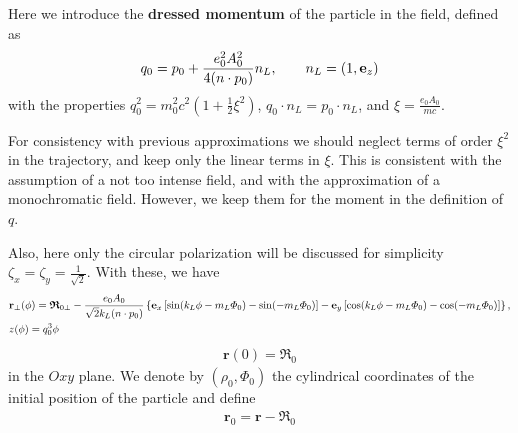 \begin{importantbox}
    Here we introduce the {\bf dressed momentum} of the particle in the field, defined as
    \begin{align}
        q_0 = p_0 + \frac{e_0^2A_0^2}{4(n\cdot p_0)}n_L, \qquad n_L=(1,{\bf e}_z)
    \end{align}
    with the properties $q_0^2=m_0^2c^2(1+\frac12\xi^2)$, $q_0\cdot n_L=p_0\cdot n_L$, and $\xi=\frac{e_0A_0}{mc}$.
\end{importantbox}
\begin{importantbox}
    For consistency with previous approximations we should neglect terms of order $\xi^2$ in the trajectory, and keep only the linear terms in $\xi$. This is consistent with the assumption of a not too intense field, and with the approximation of a monochromatic field. However, we keep them for the moment in the definition of $q$.
\end{importantbox}

Also, here only the circular polarization will be discussed for simplicity $\zeta_x=\zeta_y=\frac{1}{\sqrt{2}}$.
With these, we have
\begin{align}
     & {\bf r}_{\perp}(\phi)
    = {\boldsymbol{\mathfrak R}}_{0\perp}
    -\frac{e_0 A_0}{\sqrt{2}k_L(n\cdot p_0)}
    \left\{
    {\bf e}_x\left[\sin(k_L\phi-m_L\varPhi_0)-\sin(-m_L\varPhi_0)\right]-{\bf e}_y\left[\cos(k_L\phi-m_L\varPhi_0)-\cos(-m_L\varPhi_0)\right]
    \right\},\nonumber       \\
     & z(\phi)=q_0^3\phi
\end{align}
\begin{align}
    {\bm r}(0) = {\boldsymbol{\mathfrak R}}_0
\end{align}
in the $Oxy$ plane. We denote by $(\rho_0, \varPhi_0)$ the cylindrical coordinates of the initial position of the particle and define
\begin{align}
    {\bm r}_0={\bm r}-{\boldsymbol{\mathfrak{R}}_0}
\end{align}

